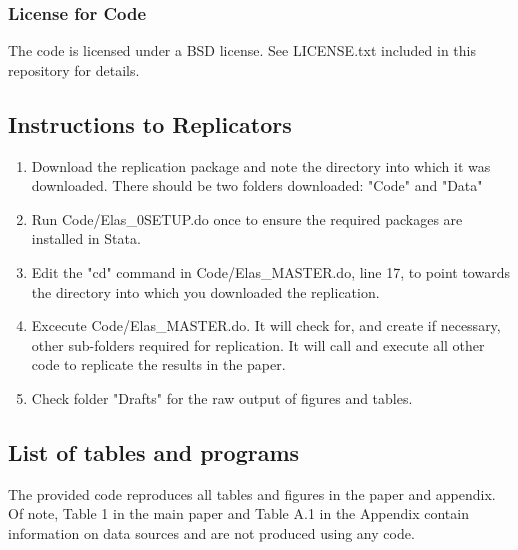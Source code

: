 \documentclass[
]{article}
\begin{document}
\hypertarget{optional-but-recommended-license-for-code}{%
\subsubsection{License for
Code}\label{optional-but-recommended-license-for-code}}

The code is licensed under a BSD license. See LICENSE.txt included in this repository for details.

\hypertarget{instructions-to-replicators}{%
\subsection{Instructions to
Replicators}\label{instructions-to-replicators}}
\begin{enumerate}
  \item Download the replication package and note the directory into which it was downloaded. There should be two folders downloaded: "Code" and "Data"
  \item Run Code/Elas\_0SETUP.do once to ensure the required packages are installed in Stata.
  \item Edit the "cd" command in Code/Elas\_MASTER.do, line 17, to point towards the directory into which you downloaded the replication.
  \item Excecute Code/Elas\_MASTER.do. It will check for, and create if necessary, other sub-folders required for replication. It will call and execute all other code to replicate the results in the paper.
  \item Check folder "Drafts" for the raw output of figures and tables.
\end{enumerate}


\hypertarget{list-of-tables-and-programs}{%
\subsection{List of tables and
programs}\label{list-of-tables-and-programs}}

The provided code reproduces all tables and figures in the paper and appendix. Of note, Table 1 in the main paper and Table A.1 in the Appendix contain information on data sources and are not produced using any code. 
\end{document}
